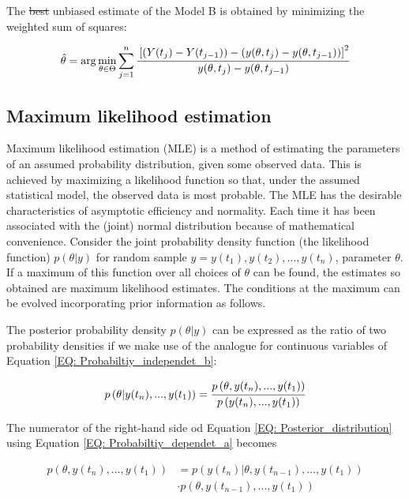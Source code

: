 \documentclass[a4paper,fleqn]{cas-dc}
\begin{document}
The \sout{best} unbiased estimate of the Model B is obtained by minimizing the weighted sum of squares:

{\footnotesize
\begin{equation*}
	\hat{\theta} = \arg \min_{\theta \in \Theta} \sum_{j=1}^{n} \cfrac{ \left[ \left( Y(t_j) - Y(t_{j-1}) \right) - \left( y(\theta, t_j) - y(\theta, t_{j-1}) \right) \right]^2  }{y(\theta, t_j) - y(\theta, t_{j-1})}
\end{equation*} }

\subsection{Maximum likelihood estimation}

Maximum likelihood estimation (MLE) is a method of estimating the parameters of an assumed probability distribution, given some observed data. This is achieved by maximizing a likelihood function so that, under the assumed statistical model, the observed data is most probable. The MLE has the desirable characteristics of asymptotic efficiency and normality. Each time it has been associated with the (joint) normal distribution because of mathematical convenience. Consider the joint probability density function (the likelihood function) $p(\theta |y)$ for random sample $y = y(t_1),y(t_2),...,y(t_n)$, parameter $\theta$. If a maximum of this function over all choices of $\theta$ can be found, the estimates so obtained are maximum likelihood estimates. The conditions at the maximum can be evolved incorporating prior information as follows.

The posterior probability density $p(\theta|y)$ can be expressed as the ratio of two probability densities if we make use of the analogue for continuous variables of Equation \ref{EQ: Probabiltiy_independet_b}:

{\footnotesize
	\begin{align} \label{EQ: Posterior_distribution}
		p\left( \theta| y(t_n),...,y(t_1) \right) = \cfrac{p\left( \theta, y(t_n),...,y(t_1) \right)}{p\left( y(t_n),...,y(t_1) \right)}
\end{align} }

The numerator of the right-hand side od Equation \ref{EQ: Posterior_distribution} using Equation \ref{EQ: Probabiltiy_dependet_a} becomes 

{\footnotesize
	\begin{equation}
		\begin{split}
			p\left( \theta,y(t_n),...,y(t_1) \right) &= p\left( y(t_n)|\theta,y(t_{n-1}),...,y(t_1) \right) \\ &\cdot p\left( \theta,y(t_{n-1}),...,y(t_1) \right)
		\end{split}
\end{equation} }
\end{document}
